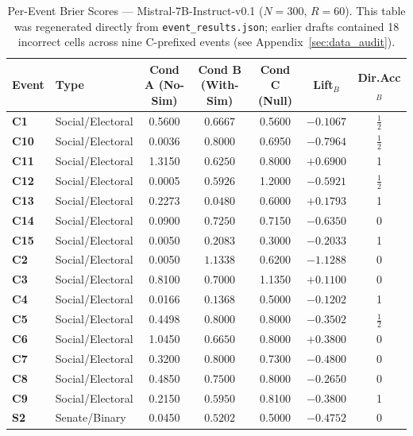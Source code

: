 \documentclass[11pt,journal,onecolumn]{IEEEtran}
\begin{document}
\begin{table}[!htbp]
\centering
\caption{Per-Event Brier Scores --- Mistral-7B-Instruct-v0.1 ($N=300$, $R=60$). This table was regenerated directly from \texttt{event\_results.json}; earlier drafts contained 18 incorrect cells across nine C-prefixed events (see Appendix~\ref{sec:data_audit}).}
\label{tab:per_event_mistral_7b}
\small
\setlength{\tabcolsep}{4pt}
\begin{tabular}{llccccc}
\toprule
\textbf{Event} & \textbf{Type} & \textbf{Cond A (No-Sim)} & \textbf{Cond B (With-Sim)} & \textbf{Cond C (Null)} & \textbf{Lift$_B$} & \textbf{Dir.Acc$_B$} \\
\midrule
\textbf{C1} & Social/Electoral & 0.5600 & $0.6667$ & 0.5600 & $-0.1067$ & $\frac{1}{2}$ \\
\textbf{C10} & Social/Electoral & 0.0036 & $0.8000$ & 0.6950 & $-0.7964$ & $\frac{1}{2}$ \\
\textbf{C11} & Social/Electoral & 1.3150 & $\mathbf{0.6250}$ & 0.8000 & $\mathbf{+0.6900}$ & 1 \\
\textbf{C12} & Social/Electoral & 0.0005 & $0.5926$ & 1.2000 & $-0.5921$ & $\frac{1}{2}$ \\
\textbf{C13} & Social/Electoral & 0.2273 & $\mathbf{0.0480}$ & 0.6000 & $\mathbf{+0.1793}$ & 1 \\
\textbf{C14} & Social/Electoral & 0.0900 & $0.7250$ & 0.7150 & $-0.6350$ & 0 \\
\textbf{C15} & Social/Electoral & 0.0050 & $0.2083$ & 0.3000 & $-0.2033$ & 1 \\
\textbf{C2} & Social/Electoral & 0.0050 & $1.1338$ & 0.6200 & $-1.1288$ & 0 \\
\textbf{C3} & Social/Electoral & 0.8100 & $\mathbf{0.7000}$ & 1.1350 & $\mathbf{+0.1100}$ & 0 \\
\textbf{C4} & Social/Electoral & 0.0166 & $0.1368$ & 0.5000 & $-0.1202$ & 1 \\
\textbf{C5} & Social/Electoral & 0.4498 & $0.8000$ & 0.8000 & $-0.3502$ & $\frac{1}{2}$ \\
\textbf{C6} & Social/Electoral & 1.0450 & $\mathbf{0.6650}$ & 0.8000 & $\mathbf{+0.3800}$ & 0 \\
\textbf{C7} & Social/Electoral & 0.3200 & $0.8000$ & 0.7300 & $-0.4800$ & 0 \\
\textbf{C8} & Social/Electoral & 0.4850 & $0.7500$ & 0.8000 & $-0.2650$ & 0 \\
\textbf{C9} & Social/Electoral & 0.2150 & $0.5950$ & 0.8100 & $-0.3800$ & 1 \\
\textbf{S2} & Senate/Binary & 0.0450 & $0.5202$ & 0.5000 & $-0.4752$ & 0 \\

\end{tabular}
\end{table}
\end{document}
